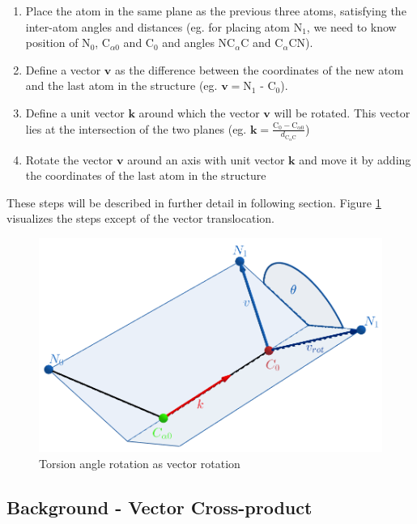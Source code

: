 \begin{enumerate}
    \item Place the atom in the same plane as the previous three atoms, satisfying the inter-atom angles and distances (eg. for placing atom N$_1$, we need to know position of N$_0$, C$_{\alpha 0}$ and C$_0$ and angles NC$_\alpha$C and C$_\alpha$CN).
    
    \item Define a vector $\bm{v}$ as the difference between the coordinates of the new atom and the last atom in the structure (eg. $\bm{v} = $N$_1$ - C$_0$).
    
    \item Define a unit vector $\bm{k}$ around which the vector $\bm{v}$ will be rotated. This vector lies at the intersection of the two planes (eg. $\bm{k} = \frac{\textrm{C}_0 - \textrm{C}_{\alpha 0}}{d_{\textrm{C}_{\alpha} \textrm{C}}}$)
    
    \item Rotate the vector $\bm{v}$ around an axis with unit vector $\bm{k}$ and move it by adding the coordinates of the last atom in the structure
\end{enumerate}

These steps will be described in further detail in following section. Figure \ref{fig:bond_rotation} visualizes the steps except of the vector translocation.

\begin{figure}
    \centering
    \includegraphics[scale=0.28]{imgs_tomas/rodrigues_backbone.png}
    \caption{Torsion angle rotation as vector rotation}
    \label{fig:bond_rotation}
\end{figure}

\subsection{Background - Vector Cross-product}

